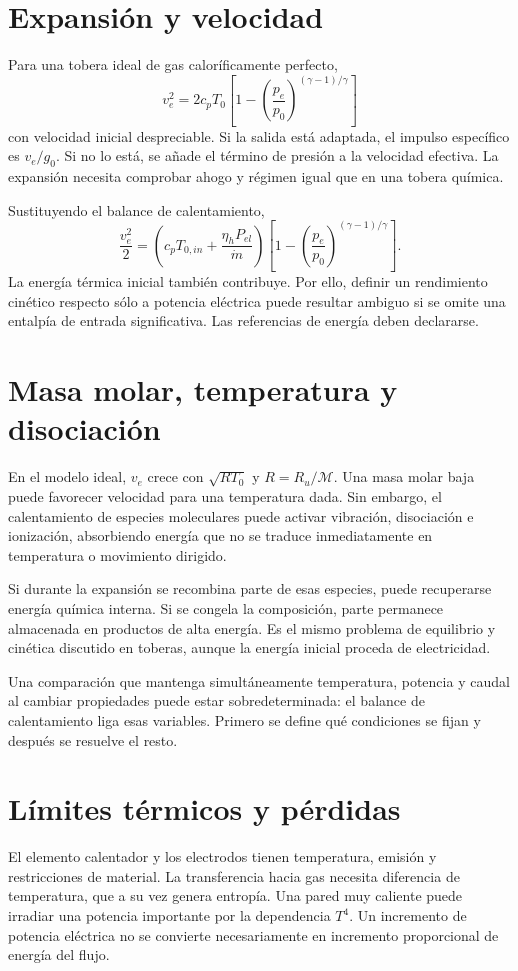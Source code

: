\section{Expansión y velocidad}
Para una tobera ideal de gas caloríficamente perfecto,
\[
 v_e^2=2c_pT_0\left[1-\left(\frac{p_e}{p_0}\right)^{(\gamma-1)/\gamma}\right]
\]
con velocidad inicial despreciable. Si la salida está adaptada, el impulso específico es $v_e/g_0$. Si no lo está, se añade el término de presión a la velocidad efectiva. La expansión necesita comprobar ahogo y régimen igual que en una tobera química.

Sustituyendo el balance de calentamiento,
\[
 \frac{v_e^2}{2}=\left(c_pT_{0,in}+\frac{\eta_hP_{el}}{\dot m}\right)
 \left[1-\left(\frac{p_e}{p_0}\right)^{(\gamma-1)/\gamma}\right].
\]
La energía térmica inicial también contribuye. Por ello, definir un rendimiento cinético respecto sólo a potencia eléctrica puede resultar ambiguo si se omite una entalpía de entrada significativa. Las referencias de energía deben declararse.
\section{Masa molar, temperatura y disociación}
En el modelo ideal, $v_e$ crece con $\sqrt{RT_0}$ y $R=R_u/\mathcal M$. Una masa molar baja puede favorecer velocidad para una temperatura dada. Sin embargo, el calentamiento de especies moleculares puede activar vibración, disociación e ionización, absorbiendo energía que no se traduce inmediatamente en temperatura o movimiento dirigido.

Si durante la expansión se recombina parte de esas especies, puede recuperarse energía química interna. Si se congela la composición, parte permanece almacenada en productos de alta energía. Es el mismo problema de equilibrio y cinética discutido en toberas, aunque la energía inicial proceda de electricidad.

Una comparación que mantenga simultáneamente temperatura, potencia y caudal al cambiar propiedades puede estar sobredeterminada: el balance de calentamiento liga esas variables. Primero se define qué condiciones se fijan y después se resuelve el resto.
\section{Límites térmicos y pérdidas}
El elemento calentador y los electrodos tienen temperatura, emisión y restricciones de material. La transferencia hacia gas necesita diferencia de temperatura, que a su vez genera entropía. Una pared muy caliente puede irradiar una potencia importante por la dependencia $T^4$. Un incremento de potencia eléctrica no se convierte necesariamente en incremento proporcional de energía del flujo.

